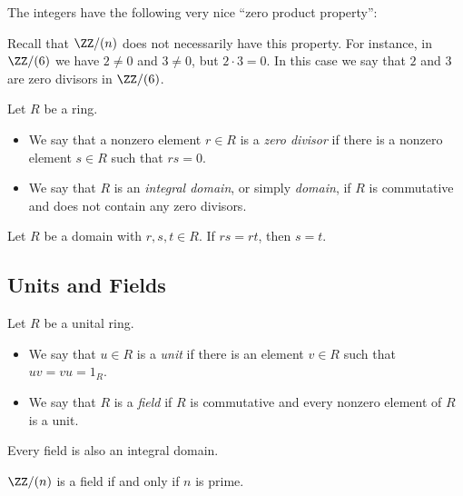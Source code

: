 \documentclass{article}
\begin{document}

The integers have the following very nice ``zero product property'':

\begin{center}
\end{center}

Recall that $\ZZ/(n)$ does not necessarily have this property. For instance, in $\ZZ/(6)$ we have $2 \neq 0$ and $3 \neq 0$, but $2 \cdot 3 = 0$. In this case we say that $2$ and $3$ are zero divisors in $\ZZ/(6)$.

\begin{dfn}
Let $R$ be a ring.
\begin{itemize}
\item We say that a nonzero element $r \in R$ is a \emph{zero divisor} if there is a nonzero element $s \in R$ such that $rs = 0$.
\item We say that $R$ is an \emph{integral domain}, or simply \emph{domain}, if $R$ is commutative and does not contain any zero divisors.
\end{itemize}
\end{dfn}

\begin{prop}[Cancellation]
Let $R$ be a domain with $r,s,t \in R$. If $rs = rt$, then $s = t$.
\end{prop}

\subsection*{Units and Fields}

\begin{dfn}[Unit]
Let $R$ be a unital ring.
\begin{itemize}
\item We say that $u \in R$ is a \emph{unit} if there is an element $v \in R$ such that $uv = vu = 1_R$.
\item We say that $R$ is a \emph{field} if $R$ is commutative and every nonzero element of $R$ is a unit.
\end{itemize}
\end{dfn}

\begin{prop}
Every field is also an integral domain.
\end{prop}

\begin{prop}
$\ZZ/(n)$ is a field if and only if $n$ is prime.
\end{prop}
\end{document}
